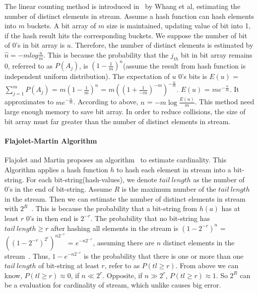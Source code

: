 The linear counting method is introduced in~\cite{whang1990linear} by Whang et
al, estimating the number of distinct elements in stream. Assume a hash function
can hash elements into $m$ buckets. A bit array of $m$ size is maintained,
updating value of bit into 1, if the hash result hits the corresponding buckets.
We suppose the number of bit of 0's in bit array is $u$. Therefore, the number
of distinct elements is estimated by $\hat{n} = -mlog\frac{u}{m}$. This is
because the probability that the $j_{th}$ bit in bit array remains 0, referred
to as $P(A_j)$, is $(1-\frac{1}{m})^n$(assume the result from hash function is
independent uniform distribution). The expectation of $u$ 0's bits is $E(u)$ =
$\sum_{j=1}^{m} P(A_j)$ = $m(1-\frac{1}{m})^n$ =
$m((1+\frac{1}{-m})^{-m})^{-\frac{n}{m}}$. $E(u)$ = $me^{-\frac{n}{m}} $. It
approximates to $me^{-\frac{n}{m}}$. According to above, $n$ =
$-m\log{\frac{E(u)}{m}}$. This method need large enough memory to save bit
array. In order to reduce collisions, the size of bit array must far greater
than the number of distinct elements in stream.

\paragraph{Flajolet-Martin Algorithm}

Flajolet and Martin proposes an algorithm~\cite{flajolet1985probabilistic} to
estimate cardinality. This Algorithm applies a hash function $h$ to hash each
element in stream into a bit-string. For each bit-string(hash-values), we denote
$tail\ length$ as the number of 0's in the end of bit-string. Assume $R$ is the
maximum number of the $tail\ length$ in the stream. Then we can estimate the
number of distinct elements in stream with
$2^R$~\cite{flajolet1985probabilistic}. This is because the probability that a
bit-string from $h(a)$ has at least $r$ 0's in then end is $2^{-r}$. The
probability that no bit-string has $tail\ length \geqslant r$ after hashing all
elements in the stream is $(1-2^{-r})^n$ = $((1-2^{-r})^{2^r})^{n2^{-r}}$ =
$e^{-n2^{-r}}$, assuming there are $n$ distinct elements in the
stream~\cite{leskovec2014mining}. Thus, $1-e^{-n2^{-r}}$ is the probability that
there is one or more than one $tail\ length$ of bit-string at least $r$, refer
to as $P(tl \geqslant r)$. From above we can know, $P(tl \geqslant r) \approx
0$, if $n \ll 2^r$. Opposite, if $n \gg 2^r$, $P(tl \geqslant r) \approx 1$. So
$2^{R}$ can be a evaluation for cardinality of stream, which unlike causes big
error.

